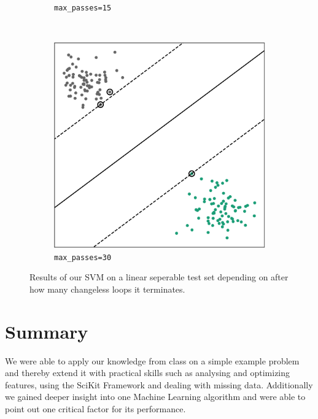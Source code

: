 \begin{figure}
\begin{subfigure}[b]{0.28\textwidth}
        \caption{\texttt{max\_passes=15}}
        \label{fig:max_pass_15}
    \end{subfigure}
    \quad
    ~ %
    \begin{subfigure}[b]{0.28\textwidth}
        \includegraphics[width=\textwidth]{media_saved/own_test_mpasses_30.pdf}
        \caption{\texttt{max\_passes=30}}
        \label{fig:max_pass_30}
    \end{subfigure}
    \caption{Results of our SVM on a linear seperable test set depending on after how many changeless loops it terminates.}\label{fig:max_passes}
\end{figure}

\section{Summary}
We were able to apply our knowledge from class on a simple example problem and thereby extend it with practical skills such as analysing and optimizing features, using the SciKit Framework and dealing with missing data. Additionally we gained deeper insight into one Machine Learning algorithm and were able to point out one critical factor for its performance.

\pagebreak
\appendix
